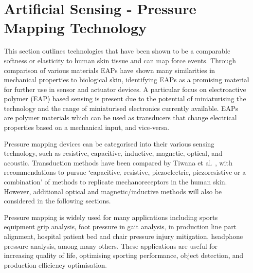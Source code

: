 \section{Artificial Sensing - Pressure Mapping Technology}
 This section outlines technologies that have been shown to be a comparable softness or elasticity to human skin tissue and can map force events. Through comparison of various materials EAPs have shown many similarities in mechanical properties to biological skin, identifying EAPs as a promising material for further use in sensor and actuator devices. A particular focus on electroactive polymer (EAP) based sensing is present due to the potential of miniaturising the technology and the range of miniaturised electronics currently available. EAPs are polymer materials which can be used as transducers that change electrical properties based on a mechanical input, and vice-versa.

Pressure mapping devices can be categorised into their various sensing technology, such as resistive, capacitive, inductive, magnetic, optical, and acoustic. Transduction methods have been compared by Tiwana et al. \cite{Tiwana2012}, with recommendations to pursue `capacitive, resistive, piezoelectric, piezoresistive or a combination' of methods to replicate mechanoreceptors in the human skin. However, additional optical and magnetic/inductive methods will also be considered in the following sections.

Pressure mapping is widely used for many applications including sports equipment grip analysis, foot pressure in gait analysis, in production line part alignment, hospital patient bed and chair pressure injury mitigation, headphone pressure analysis, among many others. These applications are useful for increasing quality of life, optimising sporting performance, object detection, and production efficiency optimisation.

